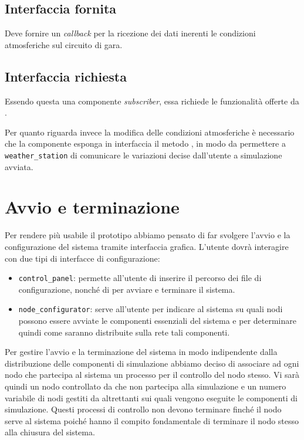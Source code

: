 \subsection*{Interfaccia fornita}
Deve fornire un \textit{callback} per la ricezione dei dati inerenti le condizioni atmosferiche sul circuito di gara.
\subsection*{Interfaccia richiesta}
Essendo questa una componente \textit{subscriber}, essa richiede le funzionalità offerte da .

Per quanto riguarda invece la modifica delle condizioni atmosferiche è necessario che la componente \weather{} esponga in interfaccia il metodo , in modo da permettere a \texttt{weather\_station} di comunicare le variazioni decise dall'utente a simulazione avviata.

\section{Avvio e terminazione}
\label{sec:start-stop}
Per rendere più usabile il prototipo abbiamo pensato di far svolgere l'avvio e la configurazione del sistema tramite interfaccia grafica.
L'utente dovrà interagire con due tipi di interfacce di configurazione:
\begin{itemize}
\item \texttt{control\_panel}: permette all'utente di inserire il percorso dei file di configurazione, nonché di per avviare e terminare il sistema.
\item \texttt{node\_configurator}: serve all'utente per indicare al sistema su quali nodi possono essere avviate le componenti essenziali del sistema e per determinare quindi come saranno distribuite sulla rete tali componenti.
\end{itemize}

Per gestire l'avvio e la terminazione del sistema in modo indipendente dalla distribuzione delle componenti di simulazione abbiamo deciso di associare ad ogni nodo che partecipa al sistema un processo per il controllo del nodo stesso. Vi sarà quindi un nodo controllato da \bootserv{} che non partecipa alla simulazione e un numero variabile di nodi gestiti da altrettanti \nodeman{} sui quali vengono eseguite le componenti di simulazione. Questi processi di controllo non devono terminare finché il nodo serve al sistema poiché hanno il compito fondamentale di terminare il nodo stesso alla chiusura del sistema.

